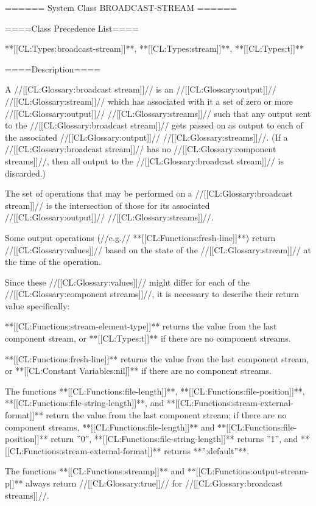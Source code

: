 ====== System Class BROADCAST-STREAM ======

====Class Precedence List====

**[[CL:Types:broadcast-stream]]**, **[[CL:Types:stream]]**, **[[CL:Types:t]]**

====Description====

A //[[CL:Glossary:broadcast stream]]// is an //[[CL:Glossary:output]]// //[[CL:Glossary:stream]]// which has associated with it a set of zero or more //[[CL:Glossary:output]]// //[[CL:Glossary:streams]]// such that any output sent to the //[[CL:Glossary:broadcast stream]]// gets passed on as output to each of the associated //[[CL:Glossary:output]]// //[[CL:Glossary:streams]]//. (If a //[[CL:Glossary:broadcast stream]]// has no //[[CL:Glossary:component streams]]//, then all output to the //[[CL:Glossary:broadcast stream]]// is discarded.)

The set of operations that may be performed on a //[[CL:Glossary:broadcast stream]]// is the intersection of those for its associated //[[CL:Glossary:output]]// //[[CL:Glossary:streams]]//.

Some output operations (//e.g.// **[[CL:Functions:fresh-line]]**) return //[[CL:Glossary:values]]// based on the state of the //[[CL:Glossary:stream]]// at the time of the operation.

Since these //[[CL:Glossary:values]]// might differ for each of the //[[CL:Glossary:component streams]]//, it is necessary to describe their return value specifically:

\beginlist

\itemitem{\bull} **[[CL:Functions:stream-element-type]]** returns the value from the last component stream, or **[[CL:Types:t]]** if there are no component streams.

\itemitem{\bull} **[[CL:Functions:fresh-line]]** returns the value from the last component stream, or **[[CL:Constant Variables:nil]]** if there are no component streams.

\itemitem{\bull} The functions **[[CL:Functions:file-length]]**, **[[CL:Functions:file-position]]**, **[[CL:Functions:file-string-length]]**, and **[[CL:Functions:stream-external-format]]** return the value from the last component stream; if there are no component streams, **[[CL:Functions:file-length]]** and **[[CL:Functions:file-position]]** return ''0'', **[[CL:Functions:file-string-length]]** returns ''1'', and **[[CL:Functions:stream-external-format]]** returns **'':default''**.

\itemitem{\bull} The functions **[[CL:Functions:streamp]]** and **[[CL:Functions:output-stream-p]]** always return //[[CL:Glossary:true]]// for //[[CL:Glossary:broadcast streams]]//.

